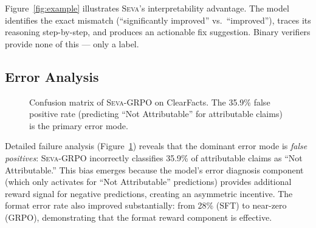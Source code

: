 \documentclass[11pt]{article}
\newcommand{\seva}{\textsc{Seva}\xspace}
\begin{document}
Figure~\ref{fig:example} illustrates \seva's interpretability advantage.
The model identifies the exact mismatch (``significantly improved'' vs.\ ``improved''), traces its reasoning step-by-step, and produces an actionable fix suggestion.
Binary verifiers provide none of this --- only a label.


\subsection{Error Analysis}

\begin{figure}[t]
\centering
{}
\caption{Confusion matrix of \seva-GRPO on ClearFacts. The 35.9\% false positive rate (predicting ``Not Attributable'' for attributable claims) is the primary error mode.}
\label{fig:confusion}
\end{figure}

Detailed failure analysis (Figure~\ref{fig:confusion}) reveals that the dominant error mode is \emph{false positives}: \seva-GRPO incorrectly classifies 35.9\% of attributable claims as ``Not Attributable.''
This bias emerges because the model's error diagnosis component (which only activates for ``Not Attributable'' predictions) provides additional reward signal for negative predictions, creating an asymmetric incentive.
The format error rate also improved substantially: from 28\% (SFT) to near-zero (GRPO), demonstrating that the format reward component is effective.
\end{document}
